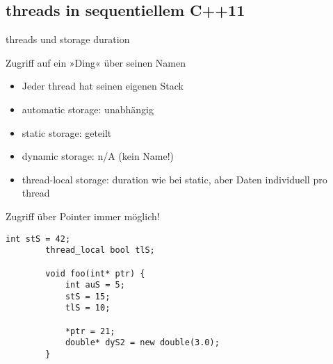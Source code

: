 \subsection{threads in sequentiellem C++11}

\begin{frame}[fragile]{threads und storage duration}
	\footnotesize
	\vspace{-0.5em}
	
	\begin{block}{\footnotesize Zugriff auf ein »Ding« über seinen Namen}
		\begin{itemize}
			\item Jeder thread hat seinen eigenen Stack
			\item automatic storage: unabhängig
			\item static storage: geteilt
			\item dynamic storage: n/A (kein Name!)
			\item thread-local storage: duration wie bei static, aber Daten individuell pro thread
		\end{itemize}
	\end{block}
	\alert<1>{Zugriff über Pointer immer möglich!}
	
	\pause
	
	\begin{lstlisting}[basicstyle=\scriptsize]
		int stS = 42;
		thread_local bool tlS;
		
		void foo(int* ptr) {
		    int auS = 5;
		    stS = 15;
		    tlS = 10;
			
		    *ptr = 21;
		    double* dyS2 = new double(3.0);
		}
	\end{lstlisting}
\end{frame}


